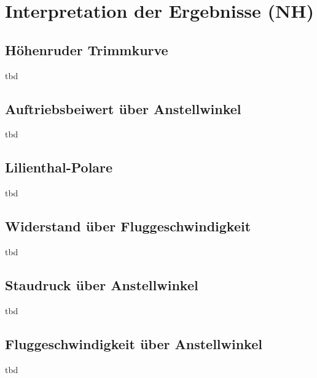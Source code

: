 \chapter{Interpretation der Ergebnisse (NH)}

\section{Höhenruder Trimmkurve}
tbd

\section{Auftriebsbeiwert über Anstellwinkel}
tbd

\section{Lilienthal-Polare}
tbd

\section{Widerstand über Fluggeschwindigkeit}
tbd

\section{Staudruck über Anstellwinkel}
tbd

\section{Fluggeschwindigkeit über Anstellwinkel}
tbd